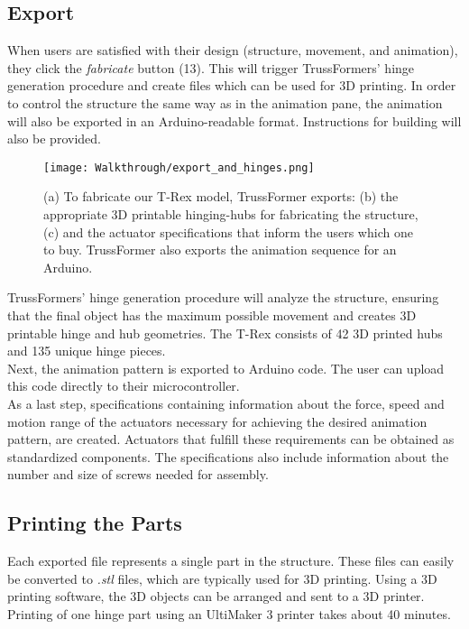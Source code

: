\subsection{Export}
When users are satisfied with their design (structure, movement, and animation), they click the \textit{fabricate} button (13). This will trigger TrussFormers' hinge generation procedure and create files which can be used for 3D printing. In order to control the structure the same way as in the animation pane, the animation will also be exported in an Arduino-readable format. Instructions for building will also be provided.
\begin{figure}[ht!]
    \texttt{[image: Walkthrough/export\_and\_hinges.png]}
    \centering
    \caption{(a) To fabricate our T-Rex model, TrussFormer exports: (b) the appropriate 3D printable hinging-hubs for fabricating the structure, (c) and the actuator specifications that inform the users which one to buy. TrussFormer also exports the animation sequence for an Arduino.}
    \label{fig:export_and_hinges}
\end{figure}

TrussFormers' hinge generation procedure will analyze the structure, ensuring that the final object has the maximum possible movement and creates 3D printable hinge and hub geometries. The T-Rex consists of 42 3D printed hubs and 135 unique hinge pieces.\\
Next, the animation pattern is exported to Arduino code. The user can upload this code directly to their microcontroller.\\
As a last step, specifications containing information about the force, speed and motion range of the actuators necessary for achieving the desired animation pattern, are created. Actuators that fulfill these requirements can be obtained as standardized components. The specifications also include information about the number and size of screws needed for assembly.

\subsection{Printing the Parts}
Each exported file represents a single part in the structure. These files can easily be converted to \textit{.stl} files, which are typically used for 3D printing. Using a 3D printing software, the 3D objects can be arranged and sent to a 3D printer. Printing of one hinge part using an UltiMaker 3 printer takes about 40 minutes.

